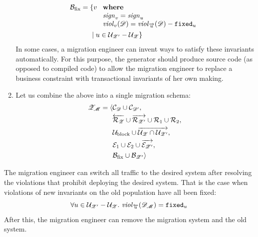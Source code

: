 \documentclass[runningheads]{llncs}
\newcommand{\id}[1]{\text{\it #1\/}}
\newcommand{\viol}[2]{\violC{#1}(#2)}
\newcommand{\violC}[1]{\id{viol}_{#1}}
\newcommand{\sign}[1]{\id{sign}_{#1}}
\newcommand{\concepts}{\mathcal{C}}
\newcommand{\rels}{\mathcal{R}}   %
\newcommand{\rules}{\mathcal{U}}
\newcommand{\transactions}{\mathcal{E}}
\newcommand{\busConstraints}{\mathcal{B}}
\newcommand{\dataset}{\mathscr{D}}
\newcommand{\schema}{\mathscr{Z}}
\newcommand{\migrsys}{\mathscr{M}}
\begin{document}
\begin{enumerate}
   \begin{align}
      \busConstraints_\text{fix}={}&\{v\ 
      \begin{array}[t]{l}
         \text{\bf where}\\
         \sign{v}=\sign{u}\\
         \viol{v}{\dataset}=\viol{\overrightarrow{u}}{\dataset}-{\tt fixed}_u
      \end{array}\\
      &\mid u\in\rules_{\schema'}-\rules_{\schema}\}\notag
   \end{align}
   In some cases, a migration engineer can invent ways to satisfy these invariants automatically.
   For this purpose, the generator should produce source code (as opposed to compiled code) to allow the migration engineer to replace a business constraint with transactional invariants of her own making.
\item Let us combine the above into a single migration schema:
   \begin{align}
      \schema_\migrsys=\langle{}&\concepts_\dataset\cup\concepts_{\dataset'},\\
      &\overleftarrow{\rels_{\schema}}\cup\overrightarrow{\rels_{\schema'}}\cup\rels_1\cup\rels_2,\notag\\
      &\rules_\text{block}\cup\overrightarrow{\rules_{\schema}\cap\rules_{\schema'}},\notag\\
      &\transactions_1\cup\transactions_2\cup\overrightarrow{\transactions_{\schema'}},\notag\\
      &\busConstraints_\text{fix}\cup\busConstraints_{\schema'}\rangle\notag
   \end{align}
\end{enumerate}
   The migration engineer can switch all traffic to the desired system
   after resolving the violations that prohibit deploying the desired system.
   That is the case when violations of new invariants on the old population have all been fixed:
\begin{equation}
   \forall u\in\rules_{\schema'}-\rules_{\schema}.\ \viol{\overleftarrow{u}}{\dataset_\migrsys}={\tt fixed}_u
\end{equation}
   After this, the migration engineer can remove the migration system and the old system.
\end{document}
